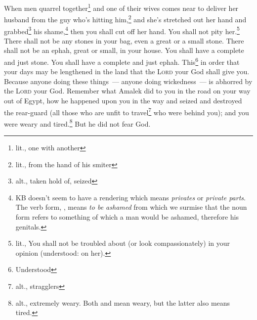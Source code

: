 \begin{inparaenum}
     When men quarrel together\footnote{lit., one with another} and one of their wives comes near to deliver her husband from the guy who's hitting him,\footnote{lit., from the hand of his smiter} and she's stretched out her hand and grabbed\footnote{alt., taken hold of, seized} his shame,\footnote{KB doesn't seem to have a rendering which means \textit{privates} or \textit{private parts}. The verb form, , means \textit{to be ashamed} from which we surmise that the noun form refers to something of which a man would be ashamed, therefore his genitals.}%
     then you shall cut off her hand. You shall not pity her.\footnote{lit., You shall not be troubled about (or look compassionately) in your opinion (understood: on her).}%
     There shall not be any stones in your bag, even a great or a small stone.%
     There shall not be an ephah, great or small, in your house.%
     You shall have a complete and just stone. You shall have a complete and just ephah. This\footnote{Understood} in order that your days may be lengthened in the land that the \textsc{Lord} your God shall give you.%
     Because anyone doing these things~--- anyone doing wickedness~--- is abhorred by the \textsc{Lord} your God.%
     Remember what Amalek did to you in the road on your way out of Egypt,%
     how he happened upon you in the way and seized and destroyed the rear-guard (all those who are unfit to travel\footnote{alt., stragglers} who were behind you); and you were weary and tired.\footnote{alt., extremely weary. Both  and  mean weary, but the latter also means tired.} But he did not fear God.%
\end{inparaenum}

